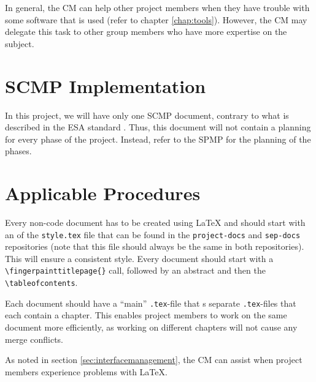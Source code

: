 In general, the CM can help other project members when they have trouble with some software that is used (refer to chapter \ref{chap:tools}). However, the CM may delegate this task to other group members who have more expertise on the subject.

\section{SCMP Implementation}
In this project, we will have only one SCMP document, contrary to what is described in the ESA standard \cite{esa}. Thus, this document will not contain a planning for every phase of the project. Instead, refer to the SPMP for the planning of the phases.

\section{Applicable Procedures}
Every non-code document has to be created using \LaTeX{} and should start with an \verb|| of the \texttt{style.tex} file that can be found in the \texttt{project-docs} and \texttt{sep-docs} repositories (note that this file should always be the same in both repositories). This will ensure a consistent style. Every document should start with a \verb|\fingerpainttitlepage{}| call, followed by an abstract and then the \verb|\tableofcontents|.

Each document should have a ``main'' \texttt{.tex}-file that \verb||s separate \texttt{.tex}-files that each contain a chapter. This enables project members to work on the same document more efficiently, as working on different chapters will not cause any merge conflicts.

As noted in section \ref{sec:interfacemanagement}, the CM can assist when project members experience problems with \LaTeX{}.